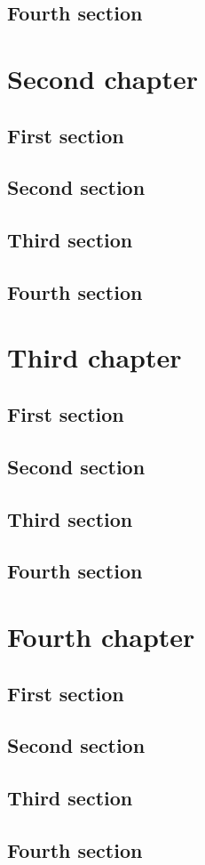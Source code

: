 \documentclass{researchbook}
\begin{document}
\section{Fourth section}\lipsum


\chapter{Second chapter}

\section{First section}\lipsum
\section{Second section}\lipsum
\section{Third section}\lipsum
\section{Fourth section}\lipsum


\chapter{Third chapter}

\section{First section}\lipsum
\section{Second section}\lipsum
\section{Third section}\lipsum
\section{Fourth section}\lipsum


\chapter{Fourth chapter}

\section{First section}\lipsum
\section{Second section}\lipsum
\section{Third section}\lipsum
\section{Fourth section}\lipsum
\end{document}
